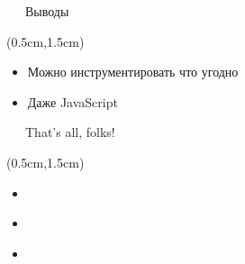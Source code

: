 \documentclass[xetex,18pt,aspectratio=43]{beamer}
\begin{document}
\begin{Large}
\begin{frame}{\ \ \ Выводы}
\begin{textblock*}{\framewidth-0.8cm}(0.5cm,1.5cm)
\begin{itemize}
  \item Можно инструментировать что угодно
  \item Даже JavaScript
\end{itemize}
\end{textblock*}
\end{frame}

\begin{frame}{\ \ \ That's all, folks!}
\begin{textblock*}{\framewidth-0.8cm}(0.5cm,1.5cm)
\begin{itemize}
  \item \href{mailto:alexclear@gmail.com}{\color{blue}{alexclear@gmail.com}}
  \item \href{https://telegram.me/lhommequipleure}{\color{blue}{https://telegram.me/lhommequipleure}}
  \item \href{https://telegram.me/demeliorator\_pod}{\color{blue}{https://telegram.me/demeliorator\_pod}}
\end{itemize}
\end{textblock*}
\end{frame}

\end{Large}
\end{document}
